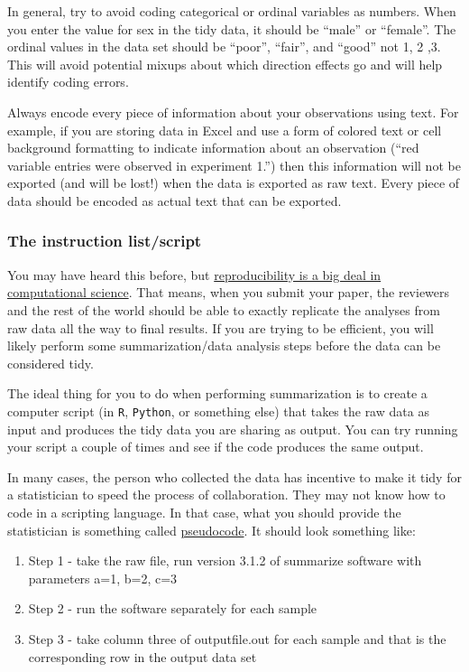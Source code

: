 \documentclass[
]{article}
\providecommand{\tightlist}{%
  \setlength{\itemsep}{0pt}\setlength{\parskip}{0pt}}
\begin{document}
In general, try to avoid coding categorical or ordinal variables as
numbers. When you enter the value for sex in the tidy data, it should be
``male'' or ``female''. The ordinal values in the data set should be
``poor'', ``fair'', and ``good'' not 1, 2 ,3. This will avoid potential
mixups about which direction effects go and will help identify coding
errors.

Always encode every piece of information about your observations using
text. For example, if you are storing data in Excel and use a form of
colored text or cell background formatting to indicate information about
an observation (``red variable entries were observed in experiment 1.'')
then this information will not be exported (and will be lost!) when the
data is exported as raw text. Every piece of data should be encoded as
actual text that can be exported.

\hypertarget{the-instruction-listscript}{%
\subsubsection{The instruction
list/script}\label{the-instruction-listscript}}

You may have heard this before, but
\href{http://www.sciencemag.org/content/334/6060/1226}{reproducibility
is a big deal in computational science}. That means, when you submit
your paper, the reviewers and the rest of the world should be able to
exactly replicate the analyses from raw data all the way to final
results. If you are trying to be efficient, you will likely perform some
summarization/data analysis steps before the data can be considered
tidy.

The ideal thing for you to do when performing summarization is to create
a computer script (in \texttt{R}, \texttt{Python}, or something else)
that takes the raw data as input and produces the tidy data you are
sharing as output. You can try running your script a couple of times and
see if the code produces the same output.

In many cases, the person who collected the data has incentive to make
it tidy for a statistician to speed the process of collaboration. They
may not know how to code in a scripting language. In that case, what you
should provide the statistician is something called
\href{http://en.wikipedia.org/wiki/Pseudocode}{pseudocode}. It should
look something like:

\begin{enumerate}
\def\labelenumi{\arabic{enumi}.}
\tightlist
\item
  Step 1 - take the raw file, run version 3.1.2 of summarize software
  with parameters a=1, b=2, c=3
\item
  Step 2 - run the software separately for each sample
\item
  Step 3 - take column three of outputfile.out for each sample and that
  is the corresponding row in the output data set
\end{enumerate}
\end{document}
